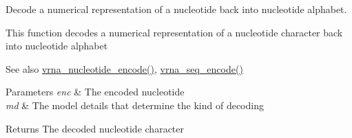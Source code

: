 Decode a numerical representation of a nucleotide back into nucleotide alphabet. 

This function decodes a numerical representation of a nucleotide character back into nucleotide alphabet

\begin{DoxySeeAlso}{See also}
\hyperlink{group__alphabet__utils_gac12bf00123f88621c9be847b0879c1fb}{vrna\+\_\+nucleotide\+\_\+encode()}, \hyperlink{group__alphabet__utils_ga636e7d6f888fd639587296a5eddea660}{vrna\+\_\+seq\+\_\+encode()}
\end{DoxySeeAlso}

\begin{DoxyParams}{Parameters}
{\em enc} & The encoded nucleotide \\
\hline
{\em md} & The model details that determine the kind of decoding \\
\hline
\end{DoxyParams}
\begin{DoxyReturn}{Returns}
The decoded nucleotide character 
\end{DoxyReturn}
